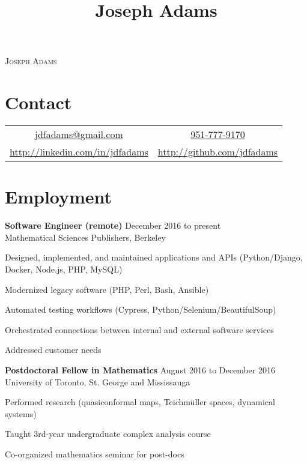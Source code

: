 \documentclass[11pt]{article}
\title{Joseph Adams}
\makeatletter
\newcommand\email{jdfadams@gmail.com}
\newcommand\phone{951-777-9170}
\makeatother
\begin{document}

\begin{center}
\textsc{\Large Joseph Adams}
\end{center}

\section*{Contact}
\begin{center}
\begin{tabular}{c c}
\href{mailto:\email}{\email} & \href{tel:1-\phone}{\phone} \\
\url{http://linkedin.com/in/jdfadams} & \url{http://github.com/jdfadams}
\end{tabular}
\end{center}

\section*{Employment}
\noindent\textbf{Software Engineer (remote)} \hfill December 2016 to present\\
Mathematical Sciences Publishers, Berkeley\\
\begin{inparaitem}
\item Designed, implemented, and maintained applications and APIs (Python/Django, Docker, Node.js, PHP, MySQL)
\item Modernized legacy software (PHP, Perl, Bash, Ansible)
\item Automated testing workflows (Cypress, Python/Selenium/BeautifulSoup)
\item Orchestrated connections between internal and external software services
\item Addressed customer needs
\end{inparaitem}

\noindent\textbf{Postdoctoral Fellow in Mathematics} \hfill August 2016 to December 2016\\
University of Toronto, St. George and Mississauga\\
\begin{inparaitem}
\item Performed research (quasiconformal maps, Teichm\"{u}ller spaces, dynamical systems)
\item Taught 3rd-year undergraduate complex analysis course
\item Co-organized mathematics seminar for post-docs
\end{inparaitem}
\end{document}
